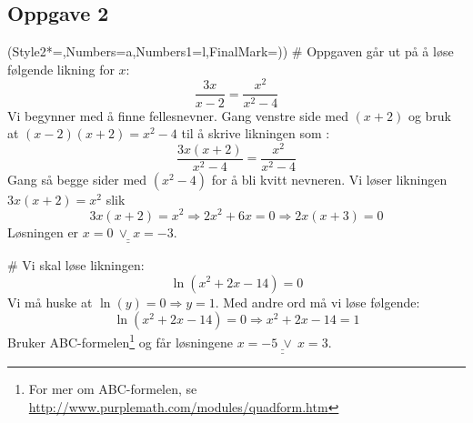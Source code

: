 \documentclass[12pt, a4paper]
{article}						%
\def\answer#1{\underline{\underline{#1}}}
\begin{document}
	\subsection*{Oppgave 2}
	\begin{easylist}[enumerate]
		\ListProperties(Style2*=,Numbers=a,Numbers1=l,FinalMark={)})
		# Oppgaven går ut på å løse følgende likning for $x$:
		\begin{equation*}
		\frac{3x}{x-2} = \frac{x^2}{x^2 - 4}
		\end{equation*}
		Vi begynner med å finne fellesnevner. Gang venstre side med $(x+2)$ og bruk at $(x-2)(x+2) = x^2 - 4$ til å skrive likningen som :
		\begin{equation*}
		\frac{3x(x+2)}{x^2 - 4} = \frac{x^2}{x^2 - 4}
		\end{equation*}
		Gang så begge sider med $(x^2 - 4)$ for å bli kvitt nevneren. Vi løser likningen $3x(x+2) = x^2$ slik
		\begin{equation*}
		3x(x+2) = x^2 \Rightarrow 2x^2 + 6x = 0 \Rightarrow 2x(x + 3) = 0
		\end{equation*}
		Løsningen er $\answer{x = 0 \ \vee \ x = -3}$.
		
		# Vi skal løse likningen:
		\begin{equation*}
		\ln \left( x^2 + 2x - 14\right) = 0
		\end{equation*}
		Vi må huske at $ \ln (y) = 0 \Rightarrow y = 1$.
		Med andre ord må vi løse følgende:
		\begin{equation*}
		\ln \left( x^2 + 2x - 14\right) = 0 \Rightarrow x^2 + 2x - 14 = 1
		\end{equation*}
		Bruker ABC-formelen\footnote{For mer om ABC-formelen, se \url{http://www.purplemath.com/modules/quadform.htm}} og får løsningene  $\answer{x = -5 \ \vee \ x = 3}$.
	\end{easylist}
	
\end{document}
